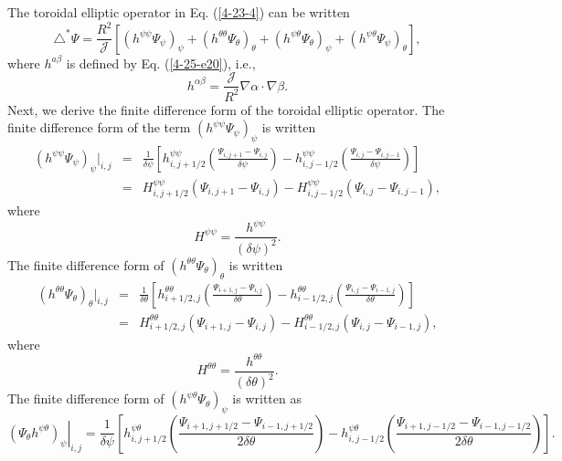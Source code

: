 \documentclass{llncs}
\newcommand{\nobracket}{}
\begin{document}
The toroidal elliptic operator in Eq. (\ref{4-23-4}) can be written
\begin{equation}
  \triangle^{\ast} \Psi = \frac{R^2}{\mathcal{J}} [(h^{\psi \psi}
  \Psi_{\psi})_{\psi} + (h^{\theta \theta} \Psi_{\theta})_{\theta} + (h^{\psi
  \theta} \Psi_{\theta})_{\psi} + (h^{\psi \theta} \Psi_{\psi})_{\theta}],
\end{equation}
where $h^{a \beta}$ is defined by Eq. (\ref{4-25-e20}), i.e.,
\begin{equation}
  \label{4-25-e20b} h^{\alpha \beta} = \frac{\mathcal{J}}{R^2} \nabla \alpha
  \cdot \nabla \beta .
\end{equation}
Next, we derive the finite difference form of the toroidal elliptic operator.
The finite difference form of the term $(h^{\psi \psi} \Psi_{\psi})_{\psi}$ is
written
\begin{eqnarray}
  \nobracket (h^{\psi \psi} \Psi_{\psi})_{\psi} |_{i, j} & = & \frac{1}{\delta
  \psi} \left[ h^{\psi \psi}_{i, j + 1 / 2} \left( \frac{\Psi_{i, j + 1} -
  \Psi_{i, j}}{\delta \psi} \right) - h_{i, j - 1 / 2}^{\psi \psi} \left(
  \frac{\Psi_{i, j} - \Psi_{i, j - 1}}{\delta \psi} \right) \right]
  \nonumber\\
  & = & H^{\psi \psi}_{i, j + 1 / 2} (\Psi_{i, j + 1} - \Psi_{i, j}) -
  H^{\psi \psi}_{i, j - 1 / 2} (\Psi_{i, j} - \Psi_{i, j - 1}), 
\end{eqnarray}
where
\begin{equation}
  H^{\psi \psi} = \frac{h^{\psi \psi}}{(\delta \psi)^2} .
\end{equation}
The finite difference form of $(h^{\theta \theta} \Psi_{\theta})_{\theta}$ is
written
\begin{eqnarray}
  \nobracket (h^{\theta \theta} \Psi_{\theta})_{\theta} |_{i, j} & = &
  \frac{1}{\delta \theta} \left[ h^{\theta \theta}_{i + 1 / 2, j} \left(
  \frac{\Psi_{i + 1, j} - \Psi_{i, j}}{\delta \theta} \right) - h^{\theta
  \theta}_{i - 1 / 2, j} \left( \frac{\Psi_{i, j} - \Psi_{i - 1, j}}{\delta
  \theta} \right) \right] \nonumber\\
  & = & H^{\theta \theta}_{i + 1 / 2, j} (\Psi_{i + 1, j} - \Psi_{i, j}) -
  H^{\theta \theta}_{i - 1 / 2, j} (\Psi_{i, j} - \Psi_{i - 1, j}), 
\end{eqnarray}
where
\begin{equation}
  H^{\theta \theta} = \frac{h^{\theta \theta}}{(\delta \theta)^2} .
\end{equation}
The finite difference form of $(h^{\psi \theta} \Psi_{\theta})_{\psi}$ is
written as
\begin{equation}
  \left. \label{4-27-e1} (\Psi_{\theta} h^{\psi \theta})_{\psi} \right|_{i, j}
  = \frac{1}{\delta \psi} \left[ h^{\psi \theta}_{i, j + 1 / 2} \left(
  \frac{\Psi_{i + 1, j + 1 / 2} - \Psi_{i - 1, j + 1 / 2}}{2 \delta \theta}
  \right) - h^{\psi \theta}_{i, j - 1 / 2} \left( \frac{\Psi_{i + 1, j - 1 /
  2} - \Psi_{i - 1, j - 1 / 2}}{2 \delta \theta} \right) \right] .
\end{equation}
\end{document}
